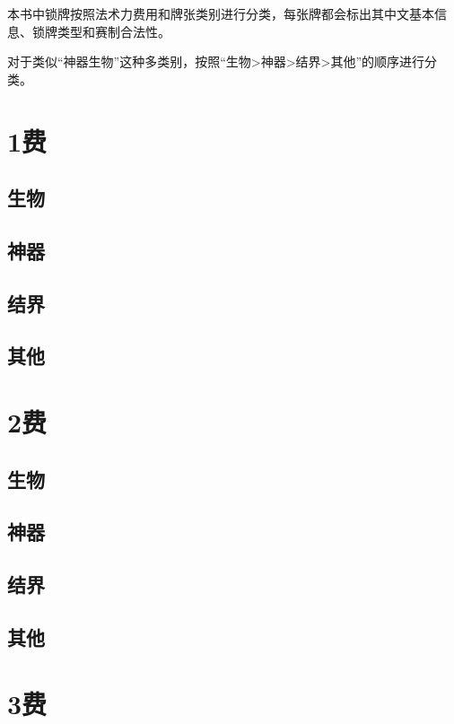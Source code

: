 \documentclass[lang = cn, color = black, 10pt]{AllThatStax}
\begin{document}
本书中锁牌按照法术力费用和牌张类别进行分类，每张牌都会标出其中文基本信息、锁牌类型和赛制合法性。

对于类似“神器生物”这种多类别，按照“生物>神器>结界>其他”的顺序进行分类。

\tableofcontents

\mainmatter

\chapter{1费}

\section{生物}

\section{神器}

\section{结界}

\section{其他}

\chapter{2费}

\section{生物}

\section{神器}

\section{结界}

\section{其他}

\chapter{3费}
\end{document}
